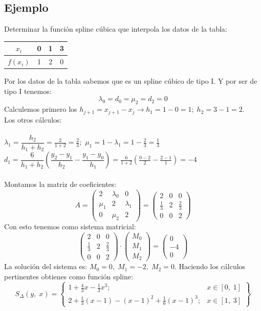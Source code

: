 \documentclass[12pt,a4paper,oneside]{scrbook}
\begin{document}
\subsection*{Ejemplo}
Determinar la función spline cúbica que interpola los datos de la tabla:
\begin{center}
    \begin{tabular}{|c||c|c|c|}
        \hline
        $x_i$    & 0 & 1 & 3 \\ \hline
        $f(x_i)$ & 1 & 2 & 0 \\ \hline
    \end{tabular}
\end{center}
Por los datos de la tabla sabemos que es un spline cúbico de tipo I. Y por ser de tipo I tenemos:
$$
\lambda_0 = d_0 = \mu_2 = d_2 = 0
$$
Calculemos primero los $h_{j+1} = x_{j+1}-x_j\longrightarrow h_1=1-0=1;\; h_2=3-1=2$.\\
Los otros cálculos:\\ \\
$\lambda_1 = \dfrac{h_2}{h_1+h_2}=\frac{2}{1+2}=\frac{2}{3};\,\,\mu_1 = 1-\lambda_1=1-\frac{2}{3}=\frac{1}{3}$\\
$d_1=\dfrac{6}{h_1+h_2}\left( \dfrac{y_2-y_1}{h_2}-\dfrac{y_1-y_0}{h_1} \right)=\frac{6}{1+2}\left( \frac{0-2}{2}-\frac{2-1}{1} \right)=-4$\\ \\
Montamos la matriz de coeficientes:
\[
A=
\begin{pmatrix}
    2 & \lambda_0 & 0\\
\mu_1 & 2  & \lambda_1 \\
    0 & \mu_2  & 2
\end{pmatrix} =
\begin{pmatrix}
    2 & 0 & 0\\
 \frac{1}{3} & 2  & \frac{2}{3} \\
    0 & 0 & 2
\end{pmatrix}
\]
Con esto tenemos como sistema matricial:
\[
\begin{pmatrix}
    2 & 0 & 0\\
 \frac{1}{3} & 2  & \frac{2}{3} \\
    0 & 0 & 2
\end{pmatrix}\cdot
\begin{pmatrix}
    M_0\\ M_1 \\ M_2
\end{pmatrix}=
\begin{pmatrix}
    0\\ -4 \\ 0
\end{pmatrix}
\]
La solución del sistema es: $M_0=0,\;M_1=-2,\;M_2=0$. Haciendo los cálculos pertinentes obtienes como función spline:
\[ S_\Delta (y,\; x) = \left\{ 
 \begin{array}{ll}
  1+\frac{4}{3}x-\frac{1}{3}x^3; & x\in [0,\; 1]\\
  2+\frac{1}{3}(x-1)-(x-1)^2+\frac{1}{6}(x-1)^3; & x\in [1,\; 3]
 \end{array} \right\}
\]
\end{document}
